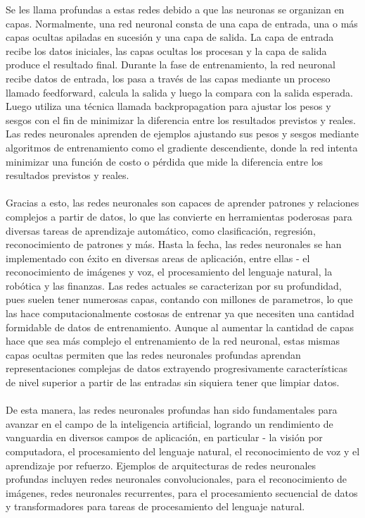 \documentclass[12pt,letterpaper,final, openany]{scrbook}
\begin{document}
Se les llama profundas a estas redes debido a que las neuronas se organizan en capas. Normalmente, una red neuronal consta de una capa de entrada, una o más capas ocultas apiladas en sucesión y una capa de salida. La capa de entrada recibe los datos iniciales, las capas ocultas los procesan y la capa de salida produce el resultado final. Durante la fase de entrenamiento, la red neuronal recibe datos de entrada, los pasa a través de las capas mediante un proceso llamado feedforward, calcula la salida y luego la compara con la salida esperada. Luego utiliza una técnica llamada backpropagation para ajustar los pesos y sesgos con el fin de minimizar la diferencia entre los resultados previstos y reales. Las redes neuronales aprenden de ejemplos ajustando sus pesos y sesgos mediante algoritmos de entrenamiento como el gradiente descendiente, donde la red intenta minimizar una función de costo o pérdida que mide la diferencia entre los resultados previstos y reales.
\\
\\
Gracias a esto, las redes neuronales son capaces de aprender patrones y relaciones complejos a partir de datos, lo que las convierte en herramientas poderosas para diversas tareas de aprendizaje automático, como clasificación, regresión, reconocimiento de patrones y más. Hasta la fecha, las redes neuronales se han implementado con éxito en diversas areas de aplicación, entre ellas - el reconocimiento de imágenes y voz, el procesamiento del lenguaje natural, la robótica y las finanzas. Las redes actuales se caracterizan por su profundidad, pues suelen tener numerosas capas, contando con millones de parametros, lo que las hace computacionalmente costosas de entrenar ya que necesiten una cantidad formidable de datos de entrenamiento. Aunque al aumentar la cantidad de capas hace que sea más complejo el entrenamiento de la red neuronal, estas mismas capas ocultas permiten que las redes neuronales profundas aprendan representaciones complejas de datos extrayendo progresivamente características de nivel superior a partir de las entradas sin siquiera tener que limpiar datos. 
\\
\\
De esta manera, las redes neuronales profundas han sido fundamentales para avanzar en el campo de la inteligencia artificial, logrando un rendimiento de vanguardia en diversos campos de aplicación, en particular - la visión por computadora, el procesamiento del lenguaje natural, el reconocimiento de voz y el aprendizaje por refuerzo. Ejemplos de arquitecturas de redes neuronales profundas incluyen redes neuronales convolucionales, para el reconocimiento de imágenes, redes neuronales recurrentes, para el procesamiento secuencial de datos y transformadores para tareas de procesamiento del lenguaje natural.
\end{document}

